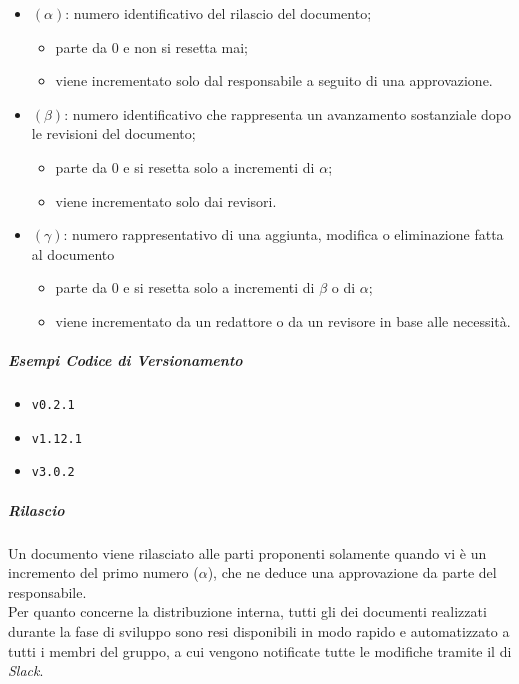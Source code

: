 		\begin{itemize}
			\item \((\alpha)\): numero identificativo del rilascio del documento;
			\begin{itemize}
				\item parte da 0 e non si resetta mai;
				\item viene incrementato solo dal responsabile a seguito di una approvazione.
			\end{itemize}
			\item \((\beta)\): numero identificativo che rappresenta un avanzamento sostanziale dopo le revisioni del documento;
			\begin{itemize}
				\item parte da 0 e si resetta solo a incrementi di \(\alpha\);
				\item viene incrementato solo dai revisori.
			\end{itemize}
			\item \((\gamma)\): numero rappresentativo di una aggiunta, modifica o eliminazione fatta al documento
			\begin{itemize}
				\item parte da 0 e si resetta solo a incrementi di \(\beta\) o di \(\alpha\);
				\item viene incrementato da un redattore o da un revisore in base alle necessità. 
			\end{itemize}
		\end{itemize}

		\subparagraph{Esempi Codice di Versionamento} 
		
		\begin{itemize}
			\item \verb!v0.2.1!
			\item \verb!v1.12.1!
			\item \verb!v3.0.2!
		\end{itemize}

		\subparagraph{Rilascio}

		Un documento viene rilasciato alle parti proponenti solamente quando vi è un incremento del primo numero (\(\alpha\)), che ne deduce una approvazione da parte del responsabile. \\ 
		Per quanto concerne la distribuzione interna, tutti gli  dei documenti realizzati durante la fase di sviluppo sono resi disponibili in modo rapido e automatizzato a tutti i membri del gruppo, a cui vengono notificate tutte le modifiche tramite il  di \textit{Slack}. 

